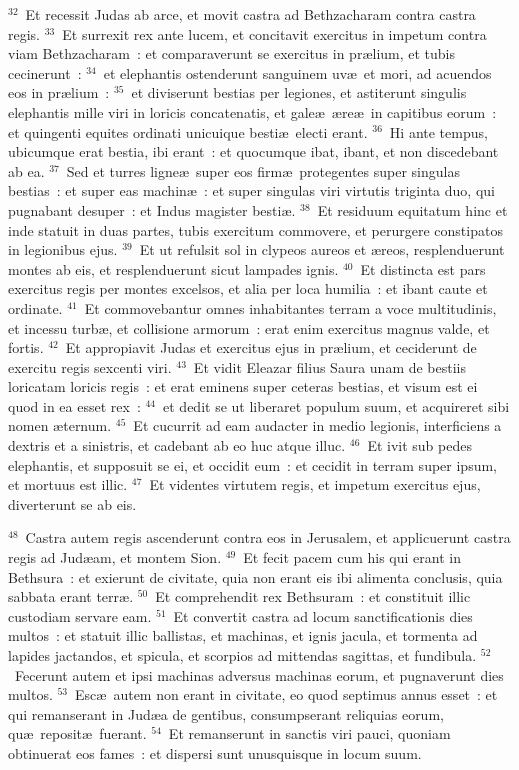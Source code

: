 ${}^{32}$~Et recessit Judas ab arce, et movit castra ad Bethzacharam contra castra regis.
${}^{33}$~Et surrexit rex ante lucem, et concitavit exercitus in impetum contra viam Bethzacharam~: et comparaverunt se exercitus in pr\ae lium, et tubis cecinerunt~:
${}^{34}$~et elephantis ostenderunt sanguinem uv\ae\ et mori, ad acuendos eos in pr\ae lium~:
${}^{35}$~et diviserunt bestias per legiones, et astiterunt singulis elephantis mille viri in loricis concatenatis, et gale\ae\ \ae re\ae\ in capitibus eorum~: et quingenti equites ordinati unicuique besti\ae\ electi erant.
${}^{36}$~Hi ante tempus, ubicumque erat bestia, ibi erant~: et quocumque ibat, ibant, et non discedebant ab ea.
${}^{37}$~Sed et turres ligne\ae\ super eos firm\ae\ protegentes super singulas bestias~: et super eas machin\ae~: et super singulas viri virtutis triginta duo, qui pugnabant desuper~: et Indus magister besti\ae .
${}^{38}$~Et residuum equitatum hinc et inde statuit in duas partes, tubis exercitum commovere, et perurgere constipatos in legionibus ejus.
${}^{39}$~Et ut refulsit sol in clypeos aureos et \ae reos, resplenduerunt montes ab eis, et resplenduerunt sicut lampades ignis.
${}^{40}$~Et distincta est pars exercitus regis per montes excelsos, et alia per loca humilia~: et ibant caute et ordinate.
${}^{41}$~Et commovebantur omnes inhabitantes terram a voce multitudinis, et incessu turb\ae , et collisione armorum~: erat enim exercitus magnus valde, et fortis.
${}^{42}$~Et appropiavit Judas et exercitus ejus in pr\ae lium, et ceciderunt de exercitu regis sexcenti viri.
${}^{43}$~Et vidit Eleazar filius Saura unam de bestiis loricatam loricis regis~: et erat eminens super ceteras bestias, et visum est ei quod in ea esset rex~:
${}^{44}$~et dedit se ut liberaret populum suum, et acquireret sibi nomen \ae ternum.
${}^{45}$~Et cucurrit ad eam audacter in medio legionis, interficiens a dextris et a sinistris, et cadebant ab eo huc atque illuc.
${}^{46}$~Et ivit sub pedes elephantis, et supposuit se ei, et occidit eum~: et cecidit in terram super ipsum, et mortuus est illic.
${}^{47}$~Et videntes virtutem regis, et impetum exercitus ejus, diverterunt se ab eis.


${}^{48}$~Castra autem regis ascenderunt contra eos in Jerusalem, et applicuerunt castra regis ad Jud\ae am, et montem Sion.
${}^{49}$~Et fecit pacem cum his qui erant in Bethsura~: et exierunt de civitate, quia non erant eis ibi alimenta conclusis, quia sabbata erant terr\ae .
${}^{50}$~Et comprehendit rex Bethsuram~: et constituit illic custodiam servare eam.
${}^{51}$~Et convertit castra ad locum sanctificationis dies multos~: et statuit illic ballistas, et machinas, et ignis jacula, et tormenta ad lapides jactandos, et spicula, et scorpios ad mittendas sagittas, et fundibula.
${}^{52}$~Fecerunt autem et ipsi machinas adversus machinas eorum, et pugnaverunt dies multos.
${}^{53}$~Esc\ae\ autem non erant in civitate, eo quod septimus annus esset~: et qui remanserant in Jud\ae a de gentibus, consumpserant reliquias eorum, qu\ae\ reposit\ae\ fuerant.
${}^{54}$~Et remanserunt in sanctis viri pauci, quoniam obtinuerat eos fames~: et dispersi sunt unusquisque in locum suum.


